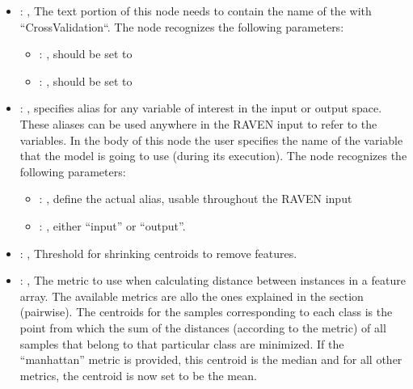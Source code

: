 \begin{itemize}
\begin{itemize}
        \item {}: ,
          List of IDs of features/variables to include in the transformation process.

        \item {}: ,
          Which space to search? Target or Feature?
      \end{itemize}

    \item {}: ,
      The text portion of this node needs to contain the name of the  with
               ``CrossValidation``.
      The  node recognizes the following parameters:
        \begin{itemize}
          \item {}: ,
            should be set to 
          \item {}: ,
            should be set to 
      \end{itemize}

    \item {}: ,
      specifies alias for         any variable of interest in the input or output space. These
      aliases can be used anywhere in the RAVEN input to         refer to the variables. In the body
      of this node the user specifies the name of the variable that the model is going to use
      (during its execution).
      The  node recognizes the following parameters:
        \begin{itemize}
          \item {}: ,
            define the actual alias, usable throughout the RAVEN input
          \item {}: ,
            either ``input'' or ``output''.
      \end{itemize}

    \item {}: ,
      Threshold for shrinking centroids to remove features.

    \item {}: ,
      The metric to use when calculating distance between instances in a feature array.
      The available metrics are allo the ones explained in the  section (pairwise).
      The centroids for the samples corresponding to each class is the point from which the sum of
      the distances (according to the metric) of all samples that belong to that particular class
      are                                                  minimized. If the ``manhattan'' metric is
      provided, this centroid is the median and for all other metrics,
      the centroid is now set to be the mean.
  \end{itemize}


